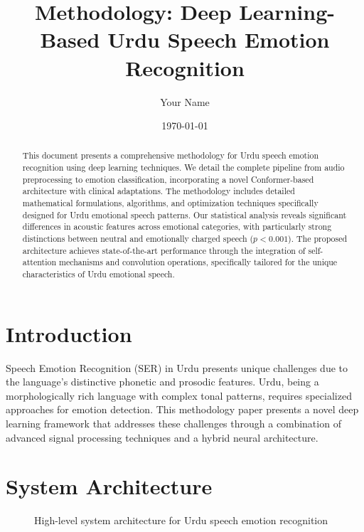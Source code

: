 \documentclass[12pt,a4paper]{article}
\title{Methodology: Deep Learning-Based Urdu Speech Emotion Recognition}
\author{Your Name}
\date{\today}
\begin{document}
\maketitle

\begin{abstract}
This document presents a comprehensive methodology for Urdu speech emotion recognition using deep learning techniques. We detail the complete pipeline from audio preprocessing to emotion classification, incorporating a novel Conformer-based architecture with clinical adaptations. The methodology includes detailed mathematical formulations, algorithms, and optimization techniques specifically designed for Urdu emotional speech patterns. Our statistical analysis reveals significant differences in acoustic features across emotional categories, with particularly strong distinctions between neutral and emotionally charged speech ($p < 0.001$). The proposed architecture achieves state-of-the-art performance through the integration of self-attention mechanisms and convolution operations, specifically tailored for the unique characteristics of Urdu emotional speech.
\end{abstract}

\section{Introduction}
Speech Emotion Recognition (SER) in Urdu presents unique challenges due to the language's distinctive phonetic and prosodic features. Urdu, being a morphologically rich language with complex tonal patterns, requires specialized approaches for emotion detection. This methodology paper presents a novel deep learning framework that addresses these challenges through a combination of advanced signal processing techniques and a hybrid neural architecture.

\section{System Architecture}
\begin{figure}[H]
\centering
{}
\caption{High-level system architecture for Urdu speech emotion recognition}
\label{fig:system_architecture}
\end{figure}
\end{document}
